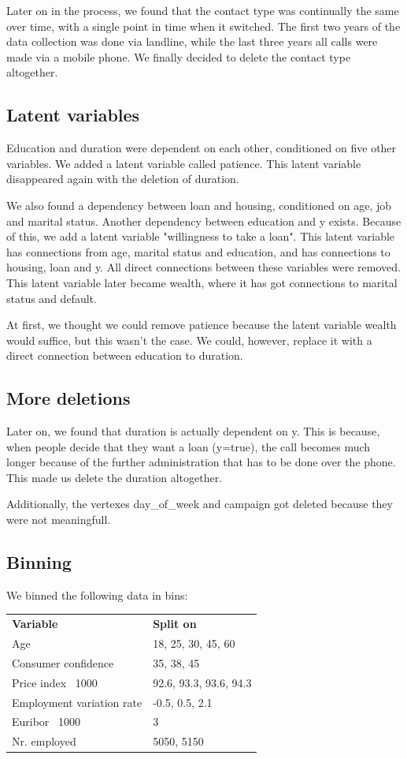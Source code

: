 \documentclass[11pt]{article}
\begin{document}
\begin{multicols}{2}
Later on in the process, we found that the contact type was
continually the same over time, with a single point in time when it switched. The first two years of the data collection was done
via landline, while the last three years all calls were made via a mobile phone.
We finally decided to delete the contact type altogether. 

\subsection{Latent variables}
Education and duration were dependent on each other, conditioned on five other
variables. We added a latent variable called patience. This latent variable
disappeared again with the deletion of duration. 

We also found a dependency between loan and housing, conditioned on age, job and
marital status. Another dependency between education and y exists. Because of
this, we add a latent variable "willingness to take a loan". This latent
variable has connections from age, marital status and education, and has
connections to housing, loan and y. All direct connections between these
variables were removed. This latent variable later became wealth, where it has
got connections to marital status and default. 

At first, we thought we could remove patience because the latent variable wealth
would suffice, but this wasn't the case. We could, however, replace it with a
direct connection between education to duration. 

\subsection{More deletions}
Later on, we found that duration is actually dependent on y. This is because,
when people decide that they want a loan (y=true), the call becomes much longer
because of the further administration that has to be done over the phone. This
made us delete the duration altogether. 

Additionally, the vertexes day\_of\_week and campaign got deleted because they
were not meaningfull. 

\subsection{Binning}
We binned the following data in bins:

\medskip
\begin{tabular}{ll}
    \textbf{Variable}           & \textbf{Split on} \\
    Age                         & 18, 25, 30, 45, 60 \\
    Consumer confidence         & 35, 38, 45 \\
    Price index \ 1000          & 92.6, 93.3, 93.6, 94.3 \\
    Employment variation rate   & -0.5, 0.5, 2.1 \\
    Euribor \ 1000              & 3 \\
    Nr. employed                & 5050, 5150 \\
\end{tabular}


\end{multicols}
\end{document}
